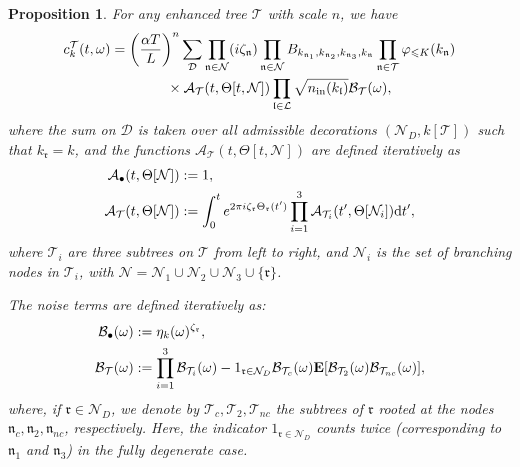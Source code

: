 \documentclass[UTF-8,reqno]{amsart}
\numberwithin{equation}{section}
\newtheorem{proposition}[theorem]{Proposition}
\theoremstyle{definition}
\def\dif{{\mathord{{\rm d}}}}
\def\leq{\leqslant}
\def\dif{{\mathord{{\rm d}}}}
\def\leq{\leqslant}
\begin{document}
\begin{proposition}\label{treedefs} 
For any enhanced tree $\mathcal{T}$ with scale $n$,  we have
\begin{align}
   \label{def:ct}
c^{\mathcal{T}}_{k}(t,\omega)&=\bigg(\frac{\alpha T}{L}\bigg)^n\sum_{\mathcal{D}}\prod_{\mathfrak{n}\in\mathcal{N}}(i\zeta_{\mathfrak{n}}%
)\prod_{\mathfrak{n}\in\mathcal{N}}B_{k_{\mathfrak{n}_1},k_{\mathfrak{n}_2},k_{\mathfrak{n}_3},k_{\mathfrak{n}}}\prod_{\mathfrak{n}\in\mathcal{T}}\varphi_{\leq K}(k_\mathfrak{n})\notag\\ 
&\quad\quad \quad\quad \times \mathcal{A}_{\mathcal{T}}(t,\Theta [t,\mathcal{N}])\prod_{\mathfrak{l}\in\mathcal{L}}\sqrt{n_{\mathrm{in}}(k_{\mathfrak{l}})}\mathcal{B}_{\mathcal{T}}(\omega),
\end{align}where the sum on $\mathcal{D}$ is taken over all admissible decorations $(\mathcal{N}_D,k[\mathcal{T}])$ such that $k_{\mathfrak{r}}=k$, and the functions $\mathcal{A}_{\mathcal{T}}(t,\Theta [t,\mathcal{N}])$ are defined iteratively as
\begin{align}\label{def:a}
    \mathcal{A}_{\bullet}(t,\Theta [\mathcal{N}])&:=1,\notag\\
     \mathcal{A}_{\mathcal{T}}(t,\Theta [\mathcal{N}])&:=\int_0^t e^{2\pi i \zeta_{\mathfrak{r}}\Theta_{\mathfrak{r}}(t')}\prod_{i=1}^3 \mathcal{A}_{\mathcal{T}_i}(t',\Theta [\mathcal{N}_i])\dif t',
\end{align}
where $\mathcal{T}_i$ are three subtrees on $\mathcal{T}$ from left to right, and $\mathcal{N}_i$ is the set of branching nodes in  $\mathcal{T}_i$, with $\mathcal{N}=\mathcal{N}_1\cup \mathcal{N}_2\cup \mathcal{N}_3\cup \{\mathfrak{r}\}$. 

The noise terms are defined iteratively as:
\begin{align}
    \mathcal{B}_{\bullet}(\omega)&:=\eta_{k}(\omega)^{\zeta_{\mathfrak{r}}},\notag\\
    \mathcal{B}_{\mathcal{T}}(\omega)&:=\prod_{i=1}^3  \mathcal{B}_{\mathcal{T}_i}(\omega)-1_{\mathfrak{r}\in\mathcal{N}_D}  \mathcal{B}_{\mathcal{T}_{c}}(\omega)\mathbf{E}[  \mathcal{B}_{\mathcal{T}_{2}}(\omega)  \mathcal{B}_{\mathcal{T}_{{nc}}}(\omega)],\label{def:Bomega}
\end{align}
where, if $\mathfrak{r}\in\mathcal{N}_D$, we denote by $\mathcal{T}_{c}, \mathcal{T}_{2}, \mathcal{T}_{nc}$ the subtrees of $\mathfrak{r}$ rooted at the nodes $\mathfrak{n}_{c}, \mathfrak{n}_{2}, \mathfrak{n}_{nc}$, respectively. Here, the indicator $1_{\mathfrak{r}\in\mathcal{N}_D}$ counts twice (corresponding to $\mathfrak{n}_1$ and $\mathfrak{n}_3$) in the fully degenerate case. 


\end{proposition}
\end{document}
